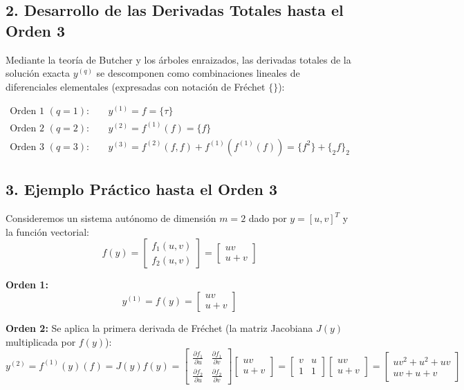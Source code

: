 \subsection*{2. Desarrollo de las Derivadas Totales hasta el Orden 3}
Mediante la teoría de Butcher y los árboles enraizados, las derivadas totales de la solución exacta $y^{(q)}$ se descomponen como combinaciones lineales de diferenciales elementales (expresadas con notación de Fréchet $\{\}$):

\begin{align*}
    \text{Orden 1 } (q=1): &\quad y^{(1)} = f = \{\tau\} \\
    \text{Orden 2 } (q=2): &\quad y^{(2)} = f^{(1)}(f) = \{f\} \\
    \text{Orden 3 } (q=3): &\quad y^{(3)} = f^{(2)}(f, f) + f^{(1)}(f^{(1)}(f)) = \{f^2\} + \{_2f\}_2
\end{align*}

\subsection*{3. Ejemplo Práctico hasta el Orden 3}
Consideremos un sistema autónomo de dimensión $m = 2$ dado por $y = [u, v]^T$ y la función vectorial:
\[
f(y) = \begin{bmatrix} f_1(u,v) \\ f_2(u,v) \end{bmatrix} = \begin{bmatrix} uv \\ u + v \end{bmatrix}
\]

\textbf{Orden 1:}
\[
y^{(1)} = f(y) = \begin{bmatrix} uv \\ u + v \end{bmatrix}
\]

\textbf{Orden 2:}
Se aplica la primera derivada de Fréchet (la matriz Jacobiana $J(y)$ multiplicada por $f(y)$):
\[
y^{(2)} = f^{(1)}(y)(f) = J(y) f(y) = \begin{bmatrix} \frac{\partial f_1}{\partial u} & \frac{\partial f_1}{\partial v} \\ \frac{\partial f_2}{\partial u} & \frac{\partial f_2}{\partial v} \end{bmatrix} \begin{bmatrix} uv \\ u + v \end{bmatrix} = \begin{bmatrix} v & u \\ 1 & 1 \end{bmatrix} \begin{bmatrix} uv \\ u + v \end{bmatrix} = \begin{bmatrix} uv^2 + u^2 + uv \\ uv + u + v \end{bmatrix}
\]

